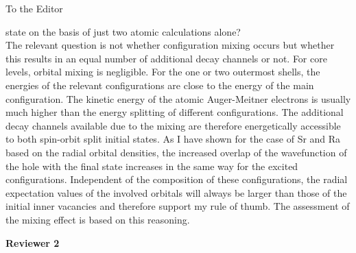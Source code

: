 \documentclass[DIN,pagenumber=false,parskip=half,fromalign=left,fromphone=false,fromemail=true,fromurl=false,fromlogo=false,fromrule=false]{scrlttr2}
\begin{document}
\begin{letter}{To the Editor}
\begin{enumerate}
{       state on the basis of just two atomic calculations alone?}\\
       The relevant question is not whether configuration mixing occurs but whether this
       results in an equal number of additional decay channels or not. For core levels,
       orbital mixing is negligible. For the one or two outermost shells,
       the energies of the relevant configurations are close to the energy of the main
       configuration. The kinetic energy of the atomic
       Auger-Meitner electrons is usually much higher than the energy splitting of different
       configurations. The additional decay
       channels available due to the mixing are therefore energetically accessible
       to both spin-orbit split initial states.
       As I have shown for the case of Sr and Ra based on the
       radial orbital densities, the increased overlap of the wavefunction of the
       hole with the final state increases in the same way for the excited
       configurations. Independent of the composition of these configurations, the
       radial expectation values of the involved orbitals will always be larger than
       those of the initial inner vacancies and therefore support my rule of thumb.
       The assessment of the mixing effect is based on this reasoning.
\end{enumerate}


\textbf{Reviewer 2}


\end{letter}
\end{document}

